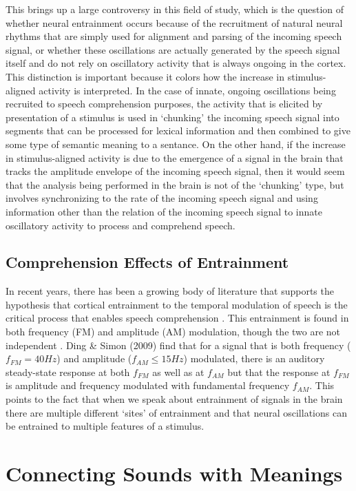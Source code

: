 \documentclass[titlepage]{article}
\begin{document}
    This brings up a large controversy in this field of study, which is the question of whether
    neural entrainment occurs because of the recruitment of natural neural rhythms that are simply
    used for alignment and parsing of the incoming speech signal, or whether these oscillations are
    actually generated by the speech signal itself and do not rely on oscillatory activity that is
    always ongoing in the cortex. This distinction is important because it colors how the increase
    in stimulus-aligned activity is interpreted. In the case of innate, ongoing oscillations being
    recruited to speech comprehension purposes, the activity that is elicited by presentation of a
    stimulus is used in `chunking' the incoming speech signal into segments that can be processed
    for lexical information and then combined to give some type of semantic meaning to a sentance.
    On the other hand, if the increase in stimulus-aligned activity is due to the emergence of a
    signal in the brain that tracks the amplitude envelope of the incoming speech signal, then
    it would seem that the analysis being performed in the brain is not of the `chunking' type,
    but involves synchronizing to the rate of the incoming speech signal and using information
    other than the relation of the incoming speech signal to innate oscillatory activity to
    process and comprehend speech.

  \subsection{Comprehension Effects of Entrainment}

    In recent years, there has been a growing body of literature that supports the hypothesis
    that cortical entrainment to the temporal modulation of speech is the critical process
    that enables speech comprehension \cite{Meyer2018,Morillon2015,ZionGolumbic2013,Doelling2014}.
    This entrainment is found in both frequency (FM) and amplitude (AM) modulation, though the
    two are not independent \cite{Ding2009}. Ding \& Simon (2009) \cite{Ding2009} find that for a signal that
    is both frequency ($f_{FM}=40Hz$) and amplitude ($f_{AM}\leq 15Hz$) modulated, there is an auditory
    steady-state response at both $f_{FM}$ as well as at $f_{AM}$ but that the response at $f_{FM}$ is
    amplitude and frequency modulated with fundamental frequency $f_{AM}$. This points to the fact that
    when we speak about entrainment of signals in the brain there are multiple different `sites' of entrainment
    and that neural oscillations can be entrained to multiple features of a stimulus.

\section{Connecting Sounds with Meanings} \label{meaning}

  \blindtext

\newpage
\printbibliography
\end{document}
